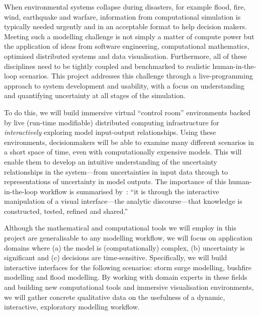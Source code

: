 \documentclass[a4paper,fontsize=12pt]{scrartcl}
\begin{document}

When environmental systems collapse during disasters, for example
flood, fire, wind, earthquake and warfare, information from
computational simulation is typically needed urgently and in an
acceptable format to help decision makers. Meeting such a modelling
challenge is not simply a matter of compute power but the application
of ideas from software engineering, computational mathematics,
optimised distributed systems and data visualisation. Furthermore, all
of these disciplines need to be tightly coupled and benchmarked to
realistic human-in-the-loop scenarios. This project addresses this
challenge through a live-programming approach to system development
and usability, with a focus on understanding and quantifying
uncertainty at all stages of the simulation.

To do this, we will build immersive virtual ``control room''
environments backed by live (run-time modifiable) distributed
computing infrastructure for \emph{interactively} exploring model
input-output relationships. Using these environments, decisionmakers
will be able to examine many different scenarios in a short space of
time, even with computationally expensive models. This will enable
them to develop an intuitive understanding of the uncertainty
relationships in the system---from uncertainties in input data through
to representations of uncertainty in model outputs. The importance of
this human-in-the-loop workflow is summarised
by~\textcite{pike_science_2009}: ``it is through the interactive
manipulation of a visual interface---the analytic discourse---that
knowledge is constructed, tested, refined and shared.''

Although the mathematical and computational tools we will employ in
this project are generalisable to any modelling workflow, we will
focus on application domains where (a) the model is (computationally)
complex, (b) uncertainty is significant and (c) decisions are
time-sensitive. Specifically, we will build interactive interfaces for
the following scenarios: storm surge modelling, bushfire modelling and
flood modelling. By working with domain experts in these fields and
building new computational tools and immersive visualisation
environments, we will gather concrete qualitative data on the
usefulness of a dynamic, interactive, exploratory modelling workflow.
\end{document}

